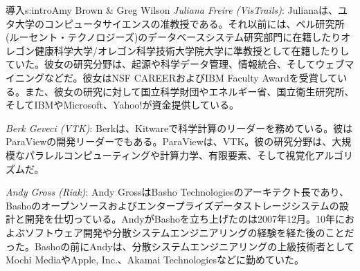 \begin{aosachapter}{導入}{s:intro}{Amy Brown \& Greg Wilson}
\emph{Juliana Freire (VisTrails)}: Julianaは、ユタ大学のコンピュータサイエンスの准教授である。それ以前には、ベル研究所(ルーセント・テクノロジーズ)のデータベースシステム研究部門に在籍したりオレゴン健康科学大学/オレゴン科学技術大学院大学に準教授として在籍したりしていた。彼女の研究分野は、起源や科学データ管理、情報統合、そしてウェブマイニングなどだ。彼女はNSF CAREERおよびIBM Faculty Awardを受賞している。また、彼女の研究に対して国立科学財団やエネルギー省、国立衛生研究所、そしてIBMやMicrosoft、Yahoo!が資金提供している。

\emph{Berk Geveci (VTK)}: Berkは、Kitwareで科学計算のリーダーを務めている。彼はParaViewの開発リーダーでもある。ParaViewは、VTK。彼の研究分野は、大規模なパラレルコンピューティングや計算力学、有限要素、そして視覚化アルゴリズムだ。

\emph{Andy Gross (Riak)}: Andy GrossはBasho Technologiesのアーキテクト長であり、Bashoのオープンソースおよびエンタープライズデータストレージシステムの設計と開発を仕切っている。AndyがBashoを立ち上げたのは2007年12月。10年におよぶソフトウェア開発や分散システムエンジニアリングの経験を経た後のことだった。Bashoの前にAndyは、分散システムエンジニアリングの上級技術者としてMochi MediaやApple, Inc.、Akamai Technologiesなどに勤めていた。


\end{aosachapter}
